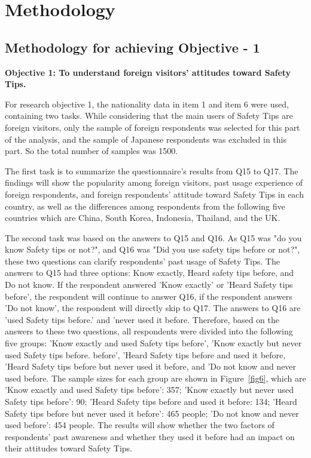 


\chapter{Methodology }

\section{Methodology for achieving Objective - 1 }

\textbf{Objective 1: To understand foreign visitors' attitudes toward Safety Tips.}

For research objective 1, the nationality data in item 1 and item 6 were used, containing two tasks. While considering that the main users of Safety Tips are foreign visitors, only the sample of foreign respondents was selected for this part of the analysis, and the sample of Japanese respondents was excluded in this part. So the total number of samples was 1500.

The first task is to summarize the questionnaire's results from Q15 to Q17. The findings will show the popularity among foreign visitors, past usage experience of foreign respondents, and foreign respondents' attitude toward Safety Tips in each country, as well as the differences among respondents from the following five countries which are China, South Korea, Indonesia, Thailand, and the UK.

The second task was based on the answers to Q15 and Q16. As Q15 was "do you know Safety tips or not?", and Q16 was "Did you use safety tips before or not?", these two questions can clarify respondents' past usage of Safety Tips. The answers to Q15 had three options: Know exactly, Heard safety tips before, and Do not know. If the respondent answered 'Know exactly' or 'Heard Safety tips before', the respondent will continue to answer Q16, if the respondent answers 'Do not know', the respondent will directly skip to Q17. The answers to Q16 are 'used Safety tips before.' and 'never used it before. Therefore, based on the answers to these two questions, all respondents were divided into the following five groups: 'Know exactly and used Safety tips before', 'Know exactly but never used Safety tips before. before', 'Heard Safety tips before and used it before, 'Heard Safety tips before but never used it before, and 'Do not know and never used before. The sample sizes for each group are shown in Figure~\ref{fig6}, which are 'Know exactly and used Safety tips before': 357; 'Know exactly but never used Safety tips before': 90; 'Heard Safety tips before and used it before: 134; 'Heard Safety tips before but never used it before': 465 people; 'Do not know and never used before': 454 people. The results will show whether the two factors of respondents' past awareness and whether they used it before had an impact on their attitudes toward Safety Tips.


